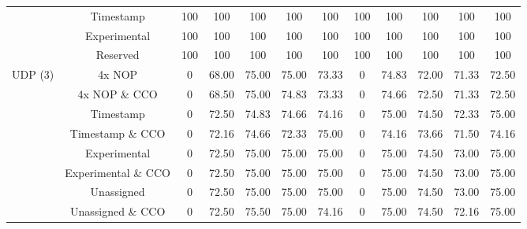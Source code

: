 \begin{table*}[t]
\begin{adjustbox}{max width=\textwidth}
\begin{tabular}{|c|c|c|c|c|c|c|c|c|c|c|c|}
        & Timestamp    & 100 & 100 & 100 & 100 & 100 & 100 & 100 & 100 & 100 & 100 \\
        & Experimental & 100 & 100 & 100 & 100 & 100 & 100 & 100 & 100 & 100 & 100 \\
        & Reserved     & 100 & 100 & 100 & 100 & 100 & 100 & 100 & 100 & 100 & 100 \\
        \hline
        \multirow{8}{*}{UDP (3)}
        & 4x NOP             & 0 & 68.00 & 75.00 & 75.00 & 73.33 & 0 & 74.83 & 72.00 & 71.33 & 72.50 \\
        & 4x NOP \& CCO       & 0 & 68.50 & 75.00 & 74.83 & 73.33 & 0 & 74.66 & 72.50 & 71.33 & 72.50 \\
        & Timestamp          & 0 & 72.50 & 74.83 & 74.66 & 74.16 & 0 & 75.00 & 74.50 & 72.33 & 75.00 \\
        & Timestamp \& CCO    & 0 & 72.16 & 74.66 & 72.33 & 75.00 & 0 & 74.16 & 73.66 & 71.50 & 74.16 \\
        & Experimental       & 0 & 72.50 & 75.00 & 75.00 & 75.00 & 0 & 75.00 & 74.50 & 73.00 & 75.00 \\
        & Experimental \& CCO & 0 & 72.50 & 75.00 & 75.00 & 75.00 & 0 & 75.00 & 74.50 & 73.00 & 75.00 \\
        & Unassigned         & 0 & 72.50 & 75.00 & 75.00 & 75.00 & 0 & 75.00 & 74.50 & 73.00 & 75.00 \\
        & Unassigned \& CCO   & 0 & 72.50 & 75.50 & 75.00 & 74.16 & 0 & 75.00 & 74.50 & 72.16 & 75.00 \\
        \hline
    \end{tabular}
    \end{adjustbox}
\end{table*}
